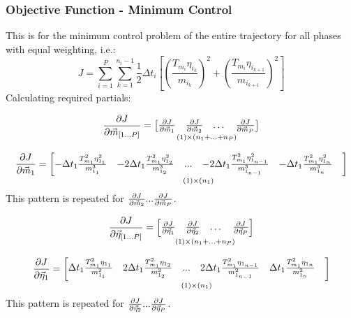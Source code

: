\newpage
\subsubsection{Objective Function - Minimum Control}
This is for the minimum control problem of the entire trajectory for all phases with equal weighting, i.e.:
\begin{equation}
J = \sum_{i=1}^{P} \sum_{k=1}^{n_i-1} \frac{1}{2} \Delta t_i
\left[
\left(
\frac{T_{m_i} \eta_{i_k}}{m_{i_k}}
\right)^2 + 
\left(
\frac{T_{m_i} \eta_{i_{k+1}}}{m_{i_{k+1}}}
\right)^2
\right]
\end{equation}
Calculating required partials:

\begin{equation}
\pdv{J}{\vec{m}_{[1 ... P]}}  =
\underset{(1) \times (n_1 + ... + n_P)}{
\begin{bmatrix}
\pdv{J}{\vec{m}_1} &
\pdv{J}{\vec{m}_2} & 
\dots &
\pdv{J}{\vec{m}_P}
\end{bmatrix}
}
\end{equation}

\begin{equation}
\pdv{J}{\vec{m}_{1}} = 
\underset{(1) \times (n_1) }{
\begin{bmatrix}
-\Delta t_1 \frac{T_{m_1}^2 \eta_{1_1}^2 }{m_{1_1}^3} & 
-2 \Delta t_1 \frac{T_{m_1}^2 \eta_{1_2}^2 }{m_{1_2}^3} & 
... & 
-2 \Delta t_1 \frac{T_{m_1}^2 \eta_{1_{n-1}}^2 }{m_{1_{n-1}}^3} & 
-\Delta t_1 \frac{T_{m_1}^2 \eta_{1_{n}}^2 }{m_{1_{n}}^3} & 
\end{bmatrix}
}
\end{equation}
This pattern is repeated for $\pdv{J}{\vec{m}_2} ... \pdv{J}{\vec{m}_P}$.

\begin{equation}
\pdv{J}{\vec{\eta}_{[1 ... P]}}  =
\underset{(1) \times (n_1 + ... + n_P)}{
\begin{bmatrix}
\pdv{J}{\vec{\eta}_1} &
\pdv{J}{\vec{\eta}_2} & 
\dots &
\pdv{J}{\vec{\eta}_P}
\end{bmatrix}
}
\end{equation}

\begin{equation}
\pdv{J}{\vec{\eta}_{1}} = 
\underset{(1) \times (n_1) }{
\begin{bmatrix}
\Delta t_1 \frac{T_{m_1}^2 \eta_{1_1} }{m_{1_1}^2} & 
2 \Delta t_1 \frac{T_{m_1}^2 \eta_{1_2} }{m_{1_2}^2} & 
... & 
2 \Delta t_1 \frac{T_{m_1}^2 \eta_{1_{n-1}} }{m_{1_{n_-1}}^2} & 
\Delta t_1 \frac{T_{m_1}^2 \eta_{1_{n}} }{m_{1_{n}}^2} & 
\end{bmatrix}
}
\end{equation}
This pattern is repeated for $\pdv{J}{\vec{\eta}_2} ... \pdv{J}{\vec{\eta}_P}$.

